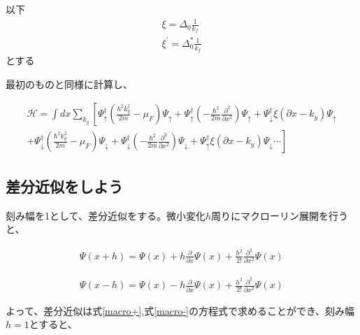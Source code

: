\documentclass{jsarticle}
\begin{document}
            以下
		    \begin{align}
			    \xi=\Delta_0\frac{1}{k_f} \\
			    \xi^{'}=\Delta_0^\ast\frac{1}{k_f}
		    \end{align}
            とする
            
            最初のものと同様に計算し、

            \begin{align}
                \mathcal{H}=\int dx \sum_{k_y}
                \left[ \Psi_\uparrow^\dagger \left( \frac{\hbar^2k_y^2}{2m}-\mu_F \right)\Psi_\uparrow
                +\Psi_\uparrow^\dagger \left(- \frac{\hbar^2}{2m}\frac{\partial^2}{\partial x^2}\right)\Psi_\uparrow
                +\Psi_\downarrow^\dagger \xi\left( \partial x-k_y \right) \Psi_\uparrow \right. \nonumber \\ \left.+
                \Psi_\downarrow^\dagger \left( \frac{\hbar^2k_y^2}{2m}-\mu_F \right)\Psi_\downarrow
                +\Psi_\downarrow^\dagger \left(- \frac{\hbar^2}{2m}\frac{\partial^2}{\partial x^2} \right) \Psi_\downarrow
                +\Psi_\uparrow^\dagger \xi \left( \partial x-k_y \right) \Psi_\downarrow \cdots
                \right]
                \label{hamil3}
            \end{align}


            \subsection{差分近似をしよう}
            刻み幅を1として、差分近似をする。微小変化$h$周りにマクローリン展開を行うと、
    
            \begin{align}
                \Psi\left(x+h\right)=\Psi\left(x\right)+h\frac{\partial}{\partial x}\Psi\left(x\right)+\frac{h^2}{2!}\frac{\partial^2}{\partial x^2}\Psi\left(x\right)
                \label{macro+}
            \end{align}
    
            \begin{align}
                \Psi\left(x-h\right)=\Psi\left(x\right)-h\frac{\partial}{\partial x}\Psi\left(x\right)+\frac{h^2}{2!}\frac{\partial^2}{\partial x^2}\Psi\left(x\right)
                \label{macro-}
            \end{align}
    
            よって、差分近似は式\eqref{macro+},式\eqref{macro-}の方程式で求めることができ、刻み幅$h=1$とすると、
    
\end{document}
